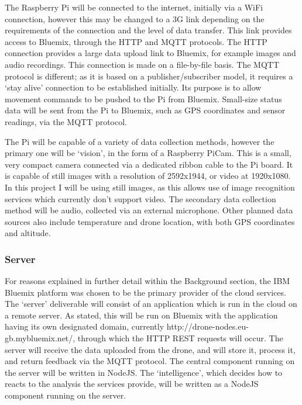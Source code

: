 \documentclass{article}
\begin{document}
The Raspberry Pi will be connected to the internet, initially via a WiFi connection, however this may be changed to a 3G link depending on the requirements of the connection and the level of data transfer. This link provides access to Bluemix, through the HTTP and MQTT protocols. The HTTP connection provides a large data upload link to Bluemix, for example images and audio recordings. This connection is made on a file-by-file basis. The MQTT protocol is different; as it is based on a publisher/subscriber model, it requires a `stay alive' connection to be established initially. Its purpose is to allow movement commands to be pushed to the Pi from Bluemix. Small-size status data will be sent from the Pi to Bluemix, such as GPS coordinates and sensor readings, via the MQTT protocol.

The Pi will be capable of a variety of data collection methods, however the primary one will be `vision', in the form of a Raspberry PiCam. This is a small, very compact camera connected via a dedicated ribbon cable to the Pi board. It is capable of still images with a resolution of 2592x1944, or video at 1920x1080. In this project I will be using still images, as this allows use of image recognition services which currently don't support video. The secondary data collection method will be audio, collected via an external microphone. Other planned data sources also include temperature and drone location, with both GPS coordinates and altitude.

\subsubsection{Server}
For reasons explained in further detail within the Background section, the IBM Bluemix platform was chosen to be the primary provider of the cloud services. The `server' deliverable will consist of an application which is run in the cloud on a remote server. As stated, this will be run on Bluemix with the application having its own designated domain, currently http://drone-nodes.eu-gb.mybluemix.net/, through which the HTTP REST requests will occur. The server will receive the data uploaded from the drone, and will store it, process it, and return feedback via the MQTT protocol. The central component running on the server will be written in NodeJS. The `intelligence', which decides how to reacts to the analysis the services provide, will be written as a NodeJS component running on the server.
\end{document}
